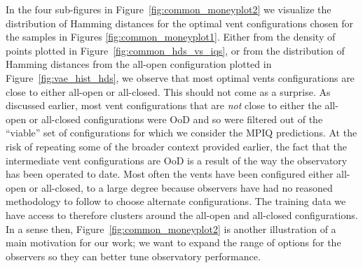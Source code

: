 In the four sub-figures in Figure~\ref{fig:common_moneyplot2} we visualize the distribution of Hamming distances for the optimal vent configurations chosen for the samples in Figures \ref{fig:common_moneyplot1}. Either from the density of points plotted in Figure~\ref{fig:common_hds_vs_iqs}, or from the distribution of Hamming distances from the all-open configuration plotted in Figure~\ref{fig:vae_hist_hds}, we observe that most optimal vents configurations are close to either all-open or all-closed.  This should not come as a surprise.  As discussed earlier, most vent configurations that are {\it not} close to either the all-open or all-closed configurations were OoD and so were filtered out of the ``viable'' set of configurations for which we consider the MPIQ predictions.  At the risk of repeating some of the broader context provided earlier, the fact that the intermediate vent configurations are OoD is a result of the way the observatory has been operated to date.  Most often the vents have been configured either all-open or all-closed, to a large degree because observers have had no reasoned methodology to follow to choose alternate configurations.  The training data we have access to therefore clusters around the all-open and all-closed configurations.  In a sense then, Figure~\ref{fig:common_moneyplot2} is  another illustration of a main motivation for our work; we want to expand the range of options for the observers so they can better tune observatory performance.

